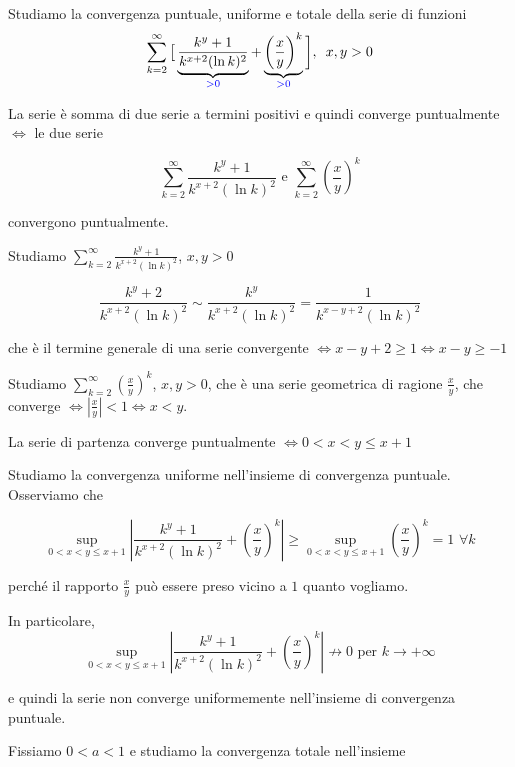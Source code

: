 \begin{exbar}
\begin{example}
	Studiamo la convergenza puntuale, uniforme e totale della serie di funzioni 
	\begin{equation*}
		\sum_{k=2}^{\infty}\big[ \underbrace{\frac{k^y+1}{k^{x+2}(\ln k)^2}}_{\color{blue}>0} + \underbrace{\left( \frac{x}{y} \right)^k}_{\color{blue}>0} \bigg], \,\,\, x,y >0
	\end{equation*} 
	
	La serie è somma di due serie a termini positivi e quindi converge puntualmente $\Leftrightarrow$ le due serie 
	
	$$\sum_{k=2}^{\infty} \frac{k^y+1}{k^{x+2}(\ln k)^2} \text{ e } \sum_{k=2}^{\infty}  \left( \frac{x}{y} \right)^k$$
	
	convergono puntualmente.
		
	Studiamo $\sum_{k=2}^{\infty} \frac{k^y+1}{k^{x+2}(\ln k)^2}$, $x,y >0$
	
	$$\frac{k^y+2}{k^{x+2}(\ln k)^2} \sim \frac{k^y}{k^{x+2}(\ln k)^2}=\frac{1}{k^{x-y+2}(\ln k)^2}$$
	
	che è il termine generale di una serie convergente $\Leftrightarrow x-y+2 \geq 1 \Leftrightarrow x-y \geq -1$
	
	Studiamo $\sum_{k=2}^{\infty} \left(\frac{x}{y}\right)^k$, $x,y>0$, che è una serie geometrica di ragione $\frac{x}{y}$, che converge $\Leftrightarrow |\frac{x}{y}|< 1 \Leftrightarrow x <y$.
	
	La serie di partenza converge puntualmente $\Leftrightarrow 0<x<y\leq x+1$

	\segnaposto

	Studiamo la convergenza uniforme nell'insieme di convergenza puntuale. Osserviamo che 
	
	$$\sup_{0<x< y\leq x+1}|\frac{k^y+1}{k^{x+2}(\ln k)^2}+\left( \frac{x}{y}\right)^k|\geq  \sup_{0<x< y\leq x+1} \left( \frac{x}{y}\right)^k=1\,\, \forall k$$ 
	
	perché il rapporto $\frac{x}{y}$ può essere preso vicino a $1$ quanto vogliamo.
	
	In particolare, 
	$$\sup_{0<x< y\leq x+1}|\frac{k^y+1}{k^{x+2}(\ln k)^2}+\left( \frac{x}{y}\right)^k|\nrightarrow 0 \text{ per } k \rightarrow +\infty$$
	
	e quindi la serie non converge uniformemente nell'insieme di convergenza puntuale.
	
	Fissiamo $0 < a  < 1$  e studiamo la convergenza totale nell'insieme 
	

\end{example}
\end{exbar}
